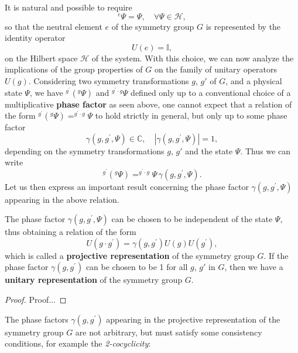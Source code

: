 It is natural and possible to require
\[
    ^e \Psi = \Psi, \quad \forall \Psi \in \mathcal{H},
\]
so that the neutral element \(e\) of the symmetry group \(G\) is represented by the identity operator
\[
    U(e) = \mathbb{I},
\]
on the Hilbert space \(\mathcal{H}\) of the system. With this choice, we can now analyze the implications of the group properties of \(G\) on the family of unitary operators \(U(g)\). Considering two symmetry transformations \(g\), \(g'\) of \(G\), and a physical state \(\Psi\), we have \(^{g^{\prime}}(^g \Psi)\) and \(^{g^{\prime} \cdot g} \Psi\) defined only up to a conventional choice of a multiplicative \textbf{phase factor} as seen above, one cannot expect that a relation of the form \(^{g^{\prime}}(^g \Psi) = ^{g^{\prime} \cdot g} \Psi\) to hold strictly in general, but only up to some phase factor
\[
    \gamma(g, g^{\prime}, \Psi) \in \mathbb{C}, \quad |\gamma(g, g^{\prime}, \Psi)| = 1,
\]
depending on the symmetry transformations \(g\), \(g'\) and the state \(\Psi\). Thus we can write
\[
    ^{g^{\prime}}(^g \Psi) = ^{g^{\prime} \cdot g} \Psi \, \gamma(g, g^{\prime}, \Psi).
\]
Let us then express an important result concerning the phase factor \(\gamma(g, g^{\prime}, \Psi)\) appearing in the above relation.
\begin{proposition}
    The phase factor \(\gamma(g, g^{\prime}, \Psi)\) can be chosen to be independent of the state \(\Psi\), thus obtaining a relation of the form
    \begin{equation}
        U(g \cdot g^{\prime}) = \gamma(g, g^{\prime}) U(g) U(g^{\prime}),
        \label{eq:projective_representation_symmetry_group_definition}
    \end{equation}
    which is called a \textbf{projective representation} of the symmetry group \(G\). If the phase factor \(\gamma(g, g^{\prime})\) can be chosen to be 1 for all \(g\), \(g'\) in \(G\), then we have a \textbf{unitary representation} of the symmetry group \(G\).
\end{proposition}
\begin{proof}
    Proof...
\end{proof}

The phase factors \(\gamma(g, g^{\prime})\) appearing in the projective representation of the symmetry group \(G\) are not arbitrary, but must satisfy some consistency conditions, for example the \textit{2-cocyclicity}:

